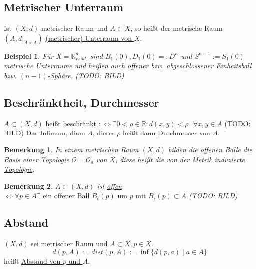 \documentclass[a4paper,11pt,notitlepage]{report}
\newtheorem{remark}{Bemerkung}[chapter]
\newtheorem{example}{Beispiel}[chapter]
\newcommand{\R}{{\ensuremath{\mathbb{R}}}}
\newcommand{\OO}{{\ensuremath{\mathcal{O}}}}
\newenvironment{Kasten}[1]
{
\hspace{0.05\linewidth}
\begin{center}
\begin{minipage}{0.9\linewidth}
\setlength{\fboxsep}{10pt}
\definecolor{shadecolor}{gray}{1}
\definecolor{framecolor}{gray}{0}
\def\FrameCommand{\fcolorbox{framecolor}{shadecolor}}
\MakeFramed {\FrameRestore}
\subsection{#1}
\begin{itshape}
}
{
\end{itshape}
\endMakeFramed
\end{minipage}
\end{center}
}
\begin{document}
\begin{Kasten}{Metrischer Unterraum}
	Ist $(X,d)$ metrischer Raum und $A \subset X$, so heißt der metrische Raum $(A, d \big |_{A \times A})$ \underline{(metrischer) Unterraum von $X$}.
\end{Kasten}

\begin{example}
	Für $X=\R_{Eukl.}^{n}$ sind $B_1(0), D_1(0) =: D^n$ und $S^{n-1}:=S_1(0)$ metrische Unterräume und heißen auch offener bzw. abgeschlossener Einheitsball bzw. $(n-1)$-Sphäre.
	\newline
	(TODO: BILD)
\end{example}

\begin{Kasten}{Beschränktheit, Durchmesser}
	$A \subset (X,d)$ heißt \underline{beschränkt} \newline $:\Leftrightarrow \exists 0 < \rho \in \R \colon d(x,y) < \rho  \text{   } \forall x,y \in A$
	\newline
	(TODO: BILD)
	\newline
	Das Infimum, diam $A$, dieser $\rho$ heißt dann \underline{Durchmesser von $A$}.
\end{Kasten}

\begin{remark}
	In einem metrischen Raum $(X,d)$ bilden die offenen Bälle die Basis einer Topologie $\OO=\OO_d$ von $X$, diese heißt \underline{die von der Metrik induzierte Topologie}.
\end{remark}

\begin{remark}
	$A \subset (X,d)$ ist \underline{offen}
	\newline
	$\Leftrightarrow \forall p \in A \exists \text{ ein offener Ball } B_\epsilon(p) \text{ um } p \text{ mit } B_\epsilon(p) \subset A$
	\newline
	(TODO: BILD)
\end{remark}

\begin{Kasten}{Abstand}
	$(X,d)$ sei metrischer Raum und $A \subset X, p \in X$.
	$$d(p,A) := dist(p,A):= \inf \{d(p,a) \mid a\in A \}$$
	heißt \underline{Abstand von $p$ und $A$}.
\end{Kasten}
\end{document}
